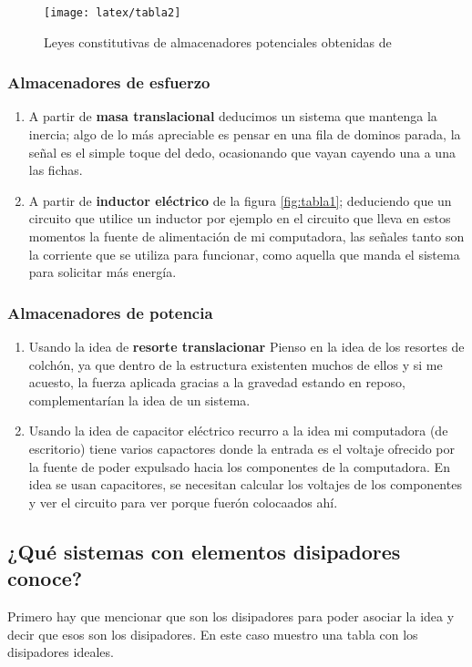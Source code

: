 \begin{figure}[H]
	\centering
	\caption{Leyes constitutivas de almacenadores potenciales obtenidas de \cite{w1}}
	\texttt{[image: latex/tabla2]}
	\label{fig:tabla2}
\end{figure}

\subsubsection{Almacenadores de esfuerzo}

\begin{enumerate}
	\item A partir de \textbf{masa translacional} deducimos un sistema que mantenga la inercia; algo de lo más apreciable es pensar en una fila de dominos parada, la señal es el simple toque del dedo, ocasionando que vayan cayendo una a una las fichas.
	\item A partir de \textbf{inductor eléctrico} de la figura \ref{fig:tabla1}; deduciendo que un circuito que utilice un inductor por ejemplo en el circuito que lleva en estos momentos la fuente de alimentación de mi computadora, las señales tanto son la corriente que se utiliza para funcionar, como aquella que manda el sistema para solicitar más energía.
\end{enumerate}

\subsubsection{Almacenadores de potencia}

\begin{enumerate}
	\item Usando la idea de \textbf{resorte translacionar} Pienso en la idea de los resortes de colchón, ya que dentro de la estructura existenten muchos de ellos y si me acuesto, la fuerza aplicada gracias a la gravedad estando en reposo, complementarían la idea de un sistema.
	\item Usando la idea de capacitor eléctrico recurro a la idea mi computadora (de escritorio) tiene varios capactores  donde la entrada es el voltaje ofrecido por la fuente de poder expulsado  hacia los componentes de la computadora. En idea se usan capacitores, se necesitan calcular los voltajes de los componentes y ver el circuito para ver porque fuerón colocaados ahí.
\end{enumerate}

\subsection{¿Qué sistemas con elementos disipadores conoce?}
Primero hay que mencionar que son los disipadores para poder asociar la idea y decir que esos son los disipadores. En este caso muestro una tabla con los disipadores ideales.

